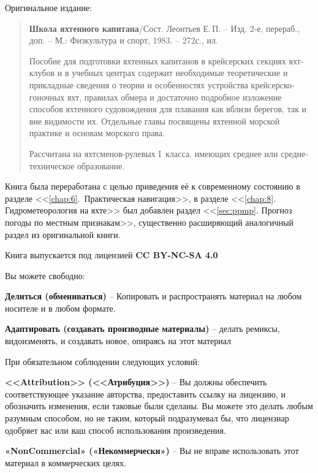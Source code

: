 \documentclass[a4paper, 12pt, twoside, final, book, russian, fittopage, cyremdash, openright]{ncc}
\begin{document}
\frontmatter



\newpage

Оригинальное издание:

\begin{quote}
  \textbf{Школа яхтенного капитана}/Сост. Леонтьев Е.\,П. \--- Изд.
  2-е, перераб., доп. \--- М.: Физкультура и спорт, 1983. \--- 272с., ил.
  
  {\footnotesize Пособие для подготовки яхтенных капитанов в крейсерских
    секциях яхт-клубов и в учебных центрах содержит необходимые
    теоретические и прикладные сведения о теории и особенностях
    устройства крейсерско-гоночных яхт, правилах обмера и достаточно
    подробное изложение способов яхтенного судовождения для плавания как
    вблизи берегов, так и вне видимости их. Отдельные главы посвящены
    яхтенной морской практике и основам морского права.
    
    Рассчитана на яхтсменов-рулевых I~класса, имеющих среднее или
    средне-техническое образование.}
\end{quote}

Книга была переработана с целью приведения её к современному состоянию
в разделе <<\ref{chap:6}.~Практическая навигация>>, в разделе
<<\ref{chap:8}. Гидрометеорология на яхте>> был добавлен раздел
<<\ref{sec:ppmp}. Прогноз погоды по местным признакам>>, существенно расширяющий
аналогичный раздел из оригинальной книги.

Книга выпускается под лицензией \cc \ccby \ccnc \ccsa \textbf{CC BY-NC-SA 4.0}

Вы можете свободно:

\textbf{Делиться (обмениваться)} \--- Копировать и распространять
материал на любом носителе и в любом формате.

\textbf{Адаптировать (создавать производные материалы)} \--- делать
ремиксы, видоизменять, и создавать новое, опираясь на этот материал

При обязательном соблюдении следующих условий:

\ccby \textbf{<<Attribution>> (<<Атрибуция>>)} \--- Вы должны обеспечить соответствующее
указание авторства, предоставить ссылку на лицензию, и обозначить
изменения, если таковые были сделаны. Вы можете это делать любым
разумным способом, но не таким, который подразумевал бы, что лицензиар
одобряет вас или ваш способ использования произведения.

\ccnc \textbf{«NonCommercial» («Некоммерчески»)} \--- Вы не вправе использовать
этот материал в коммерческих целях.
\end{document}
